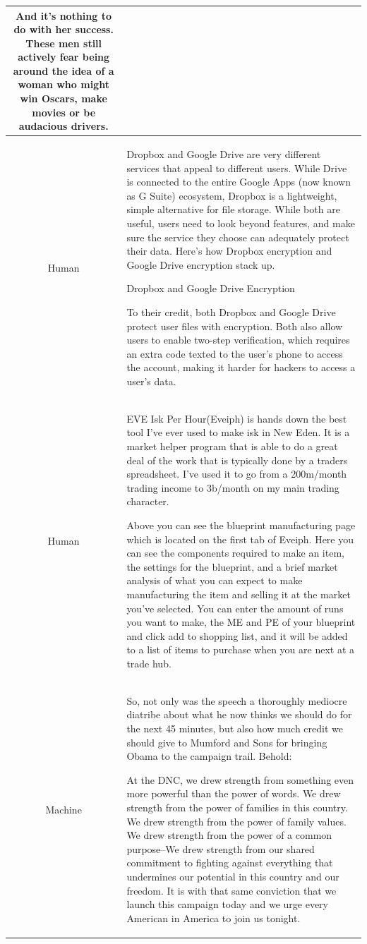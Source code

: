 \begin{table}[]
\begin{tabular}{c|p{5.5in}}
And it's nothing to do with her success. These men still actively fear being around the idea of a woman who might win Oscars, make movies or be audacious drivers. 
\\
\hline
Human
&
Dropbox and Google Drive are very different services that appeal to different users. While Drive is connected to the entire Google Apps (now known as G Suite) ecosystem, Dropbox is a lightweight, simple alternative for file storage. While both are useful, users need to look beyond features, and make sure the service they choose can adequately protect their data. Here's how Dropbox encryption and Google Drive encryption stack up.

Dropbox and Google Drive Encryption

To their credit, both Dropbox and Google Drive protect user files with encryption. Both also allow users to enable two-step verification, which requires an extra code texted to the user's phone to access the account, making it harder for hackers to access a user's data. 
\\
\hline
Human
&
EVE Isk Per Hour(Eveiph) is hands down the best tool I've ever used to make isk in New Eden. It is a market helper program that is able to do a great deal of the work that is typically done by a traders spreadsheet. I've used it to go from a 200m/month trading income to 3b/month on my main trading character.

Above you can see the blueprint manufacturing page which is located on the first tab of Eveiph. Here you can see the components required to make an item, the settings for the blueprint, and a brief market analysis of what you can expect to make manufacturing the item and selling it at the market you've selected. You can enter the amount of runs you want to make, the ME and PE of your blueprint and click add to shopping list, and it will be added to a list of items to purchase when you are next at a trade hub.
\\
\hline
Machine
&
So, not only was the speech a thoroughly mediocre diatribe about what he now thinks we should do for the next 45 minutes, but also how much credit we should give to Mumford and Sons for bringing Obama to the campaign trail. Behold:

At the DNC, we drew strength from something even more powerful than the power of words. We drew strength from the power of families in this country. We drew strength from the power of family values. We drew strength from the power of a common purpose--We drew strength from our shared commitment to fighting against everything that undermines our potential in this country and our freedom. It is with that same conviction that we launch this campaign today and we urge every American in America to join us tonight.


\end{tabular}
\end{table}
